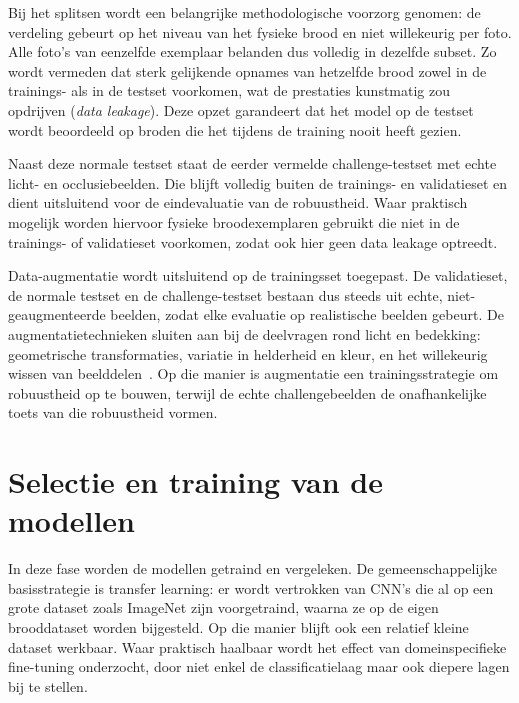 Bij het splitsen wordt een belangrijke methodologische voorzorg genomen: de verdeling
gebeurt op het niveau van het fysieke brood en niet willekeurig per foto. Alle foto's
van eenzelfde exemplaar belanden dus volledig in dezelfde subset. Zo wordt vermeden
dat sterk gelijkende opnames van hetzelfde brood zowel in de trainings- als in de
testset voorkomen, wat de prestaties kunstmatig zou opdrijven (\emph{data leakage}).
Deze opzet garandeert dat het model op de testset wordt beoordeeld op broden die het
tijdens de training nooit heeft gezien.

Naast deze normale testset staat de eerder vermelde challenge-testset met echte licht-
en occlusiebeelden. Die blijft volledig buiten de trainings- en validatieset en dient
uitsluitend voor de eindevaluatie van de robuustheid. Waar praktisch mogelijk worden
hiervoor fysieke broodexemplaren gebruikt die niet in de trainings- of validatieset
voorkomen, zodat ook hier geen data leakage optreedt.

Data-augmentatie wordt uitsluitend op de trainingsset toegepast. De validatieset, de
normale testset en de challenge-testset bestaan dus steeds uit echte,
niet-geaugmenteerde beelden, zodat elke evaluatie op realistische beelden gebeurt. De
augmentatietechnieken sluiten aan bij de deelvragen rond licht en bedekking:
geometrische transformaties, variatie in helderheid en kleur, en het willekeurig
wissen van beelddelen~\autocite{Shorten2019}. Op die manier is augmentatie een
trainingsstrategie om robuustheid op te bouwen, terwijl de echte challengebeelden de
onafhankelijke toets van die robuustheid vormen.

\section{Selectie en training van de modellen}

In deze fase worden de modellen getraind en vergeleken. De gemeenschappelijke
basisstrategie is transfer learning: er wordt vertrokken van CNN's die al op een
grote dataset zoals ImageNet zijn voorgetraind, waarna ze op de eigen brooddataset
worden bijgesteld. Op die manier blijft ook een relatief kleine dataset werkbaar.
Waar praktisch haalbaar wordt het effect van domeinspecifieke fine-tuning onderzocht,
door niet enkel de classificatielaag maar ook diepere lagen bij te stellen.

